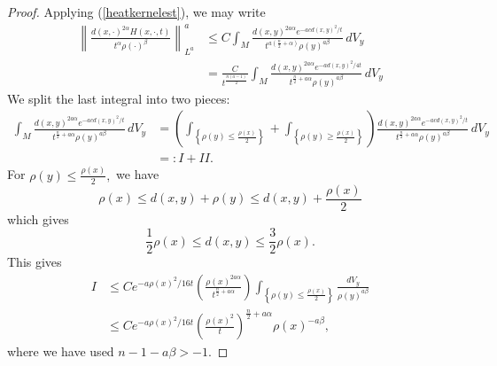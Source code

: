\documentclass[12pt]{amsart}
\renewcommand{\1}{{\mathbf 1}}
\theoremstyle{others}
\numberwithin{equation}{section}
\begin{document}
\begin{proof}
    Applying (\ref{heatkernelest}), we may write
    \begin{equation}\label{Laest}
    \begin{split}
        \left\|  \frac{d(x,\cdot)^{2\alpha} H(x,\cdot, t) }{t^\alpha \rho(\cdot)^\beta} \right\|_{L^{a}}^a & \leq C \int_M \frac{d(x,y)^{2a\alpha} e^{-a c d(x,y)^2/t} }{t^{a \left( \frac{n}{2} + \alpha \right)} \rho(y)^{a\beta} } \, dV_y \\
        & = \frac{C}{t^{\frac{n(a - 1)}{2}}} \int_M \frac{d(x,y)^{2a\alpha} e^{-a d(x,y)^2/4t} }{t^{\frac{n}{2} + a\alpha } \rho(y)^{a\beta} } \, dV_y
        \end{split}
        \end{equation}
    We split the last integral into two pieces: %
    \begin{equation}\label{I-IIdefinition}
    \begin{split}
    \int_M \frac{d(x,y)^{2a\alpha} e^{-a cd(x,y)^2/t} }{t^{\frac{n}{2} + a\alpha } \rho(y)^{a\beta} } \, dV_y & = \left( \int_{\left\{ \rho(y) \leq \frac{\rho(x)}{2} \right\} } + \int_{\left\{ \rho(y) \geq \frac{\rho(x)}{2} \right\} } \right)  \frac{d(x,y)^{2a\alpha} e^{-a cd(x,y)^2/t} }{t^{\frac{n}{2} + a\alpha } \rho(y)^{a\beta} } \, dV_y \\
    & =: I + II.
    \end{split}
    \end{equation}
    For $\rho(y) \leq \frac{\rho(x)}{2},$ we have
    $$\rho(x) \leq d(x,y) + \rho(y) \leq d(x,y) + \frac{\rho(x)}{2}$$
    which gives
    $$\frac12 \rho(x) \leq d(x,y) \leq \frac32 \rho(x).$$
    This gives
    \begin{equation}\label{Ifinalest}
    \begin{split}
    I & \leq C e^{-a \rho(x)^2/16t} \left( \frac{\rho(x)^{2a\alpha}}{t^{\frac{n}{2} + a\alpha}} \right) \int_{\left\{ \rho(y) \leq \frac{\rho(x)}{2} \right\} } \frac{dV_y}{\rho(y)^{a\beta}} \\
    & \leq C e^{-a \rho(x)^2/16t} \left( \frac{\rho(x)^2}{t} \right)^{\frac{n}{2} + a\alpha}  \rho(x)^{- a\beta},
    \end{split}
    \end{equation}
    where we have used $n -1 - a\beta > -1.$ %
    

\end{proof}
\end{document}

